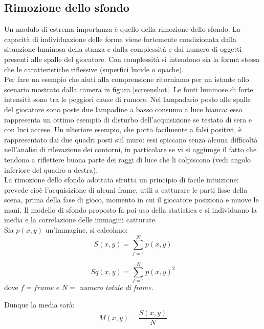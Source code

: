 \documentclass[a4paper,10pt, twocolumn]{article}
\begin{document}
  \subsection{Rimozione dello sfondo}\label{bgremoval}
  Un modulo di estrema importanza \`{e} quello della rimozione dello sfondo.
  La capacit\`{a} di individuazione delle forme viene fortemente condizionata
  dalla situazione luminosa della stanza e dalla complessit\`{a} 
  e dal numero di oggetti presenti alle spalle del giocatore.
  Con complessit\`{a} si intendono sia la forma stessa che le caratteristiche 
  riflessive (superfici lucide o opache).\\
  Per fare un esempio che aiuti alla comprensione ritorniamo per un istante
  allo scenario mostrato dalla camera in figura \ref{screenshot}.
  Le fonti luminose di forte intensit\`{a} sono tra le peggiori 
  cause di rumore. Nel lampadario posto alle spalle del giocatore sono poste
  due lampadine a basso consumo a luce bianca: esso rappresenta un ottimo esempio
  di disturbo dell'acquisizione se testato di sera e con luci accese.
  Un ulteriore esempio, che porta facilmente a falsi positivi,
  \`{e} rappresentato dai due quadri posti sul muro: essi spiccano senza alcuna
  difficolt\`{a} nell'analisi di rilevazione dei contorni, in particolare 
  se vi si aggiunge il fatto che tendono a riflettere buona parte dei
  raggi di luce che li colpiscono (vedi angolo inferiore del quadro 
  a destra).\\
  La rimozione dello sfondo adottata sfrutta un principio di facile intuizione: 
  prevede cio\`{e} l'acquisizione di alcuni frame,
  utili a catturare le parti fisse della scena,
  prima della fase di gioco, momento in cui il giocatore
  posiziona e muove le mani. Il modello di sfondo proposto fa poi uso 
  della statistica e si individuano la media e la correlazione 
  delle immagini catturate.\\
  Sia $p(x,y)$ un'immagine, si calcolano: 
  \begin{equation}
  S(x,y) = \sum_{f=1}^{N} p(x,y) 
  \end{equation} 
  
  \begin{equation}
  Sq(x,y) = \sum_{f=1}^{N} p(x,y)^2 
  \end{equation}   
  dove $f=frame$ e $N=$ \textit{numero totale di frame}.
  
  Dunque la media sar\`{a}:  
  \begin{equation}
   M(x,y) = \dfrac{S(x,y)}{N}
  \end{equation}
  
\end{document}
